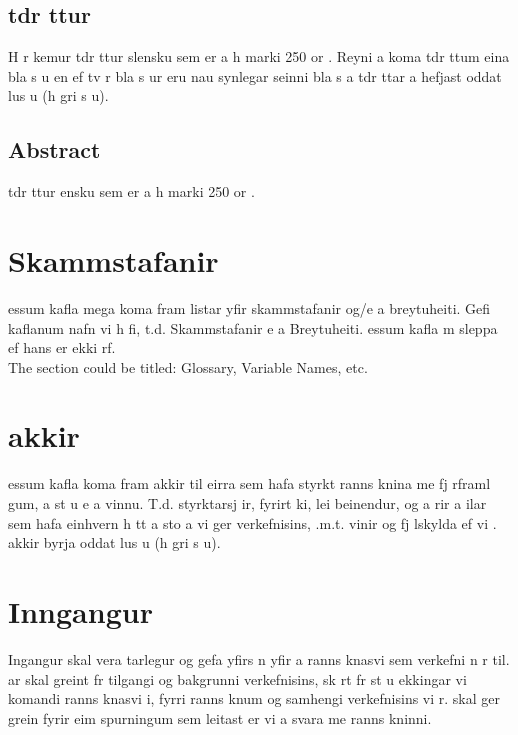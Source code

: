 \documentclass{article}
\begin{document}
\section*{\huge  tdr ttur}
H r kemur  tdr ttur    slensku sem er a  h marki 250 or . Reyni  a  koma  tdr ttum   eina bla s u en ef tv r bla s ur eru nau synlegar   seinni bla s a  tdr ttar a  hefjast   oddat lus u (h gri s u).
\vfill

\section*{\huge Abstract}
 tdr ttur   ensku sem er a  h marki 250 or .
\vfill \vspace*{1cm}

\newpage





\chapter*{Skammstafanir}
   essum kafla mega koma fram listar yfir skammstafanir og/e a breytuheiti. Gefi  kaflanum nafn vi  h fi, t.d. Skammstafanir e a Breytuheiti.  essum kafla m  sleppa ef hans er ekki  rf. \\

The section could be titled: Glossary, Variable Names, etc.

\chapter*{ akkir}
   essum kafla koma fram  akkir til  eirra sem hafa styrkt ranns knina me  fj rframl gum, a st u e a vinnu. T.d. styrktarsj ir, fyrirt ki, lei beinendur, og a rir a ilar sem hafa   einhvern h tt a sto a  vi  ger  verkefnisins,  .m.t. vinir og fj lskylda ef vi   .  akkir byrja   oddat lus u (h gri s u).


\chapter{Inngangur}
\setcounter{page}{1}
Ingangur skal vera  tarlegur og gefa yfirs n yfir  a  ranns knasvi  sem verkefni  n r til.  ar skal greint fr  tilgangi og bakgrunni verkefnisins, sk rt fr  st u  ekkingar   vi komandi ranns knasvi i, fyrri ranns knum og samhengi verkefnisins vi   r.   skal ger  grein fyrir  eim spurningum sem leitast er vi  a  svara me  ranns kninni.
\end{document}
